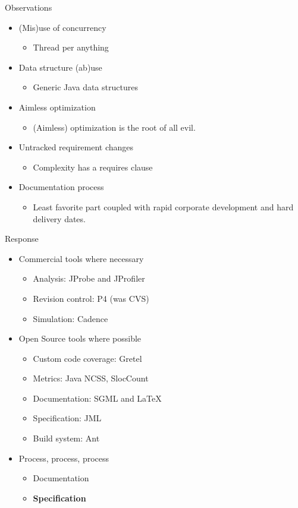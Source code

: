 \documentclass[%
final,
slideColor,
nototal,
nocolorBG,
pdf,
accumulate,
next,
]{prosper}
\begin{document}
\begin{slide}{Observations}
  \begin{itemize}
  \item (Mis)use of concurrency
    \begin{itemize}
    \item Thread per anything
    \end{itemize}
  \item Data structure (ab)use
    \begin{itemize}
    \item Generic Java data structures
    \end{itemize}
  \item Aimless optimization
    \begin{itemize}
    \item (Aimless) optimization is the root of all evil.
    \end{itemize}
  \item Untracked requirement changes
    \begin{itemize}
    \item Complexity has a requires clause
    \end{itemize}
  \item Documentation process
    \begin{itemize}
    \item Least favorite part coupled with rapid corporate development and hard
    delivery dates.
    \end{itemize}
  \end{itemize}
\end{slide}

\begin{slide}{Response}
  \begin{itemize}
  \item Commercial tools where necessary
    \begin{itemize}
    \item Analysis: JProbe and JProfiler
    \item Revision control: P4 (was CVS)
    \item Simulation: Cadence
    \end{itemize}
  \item Open Source tools where possible
    \begin{itemize}
    \item Custom code coverage: Gretel
    \item Metrics: Java NCSS, SlocCount
    \item Documentation: SGML and \LaTeX\
    \item Specification: JML
    \item Build system: Ant
    \end{itemize}
  \item Process, process, process
    \begin{itemize}
    \item Documentation
    \item \textbf{Specification}
    \end{itemize}
  \end{itemize}
\end{slide}
\end{document}
